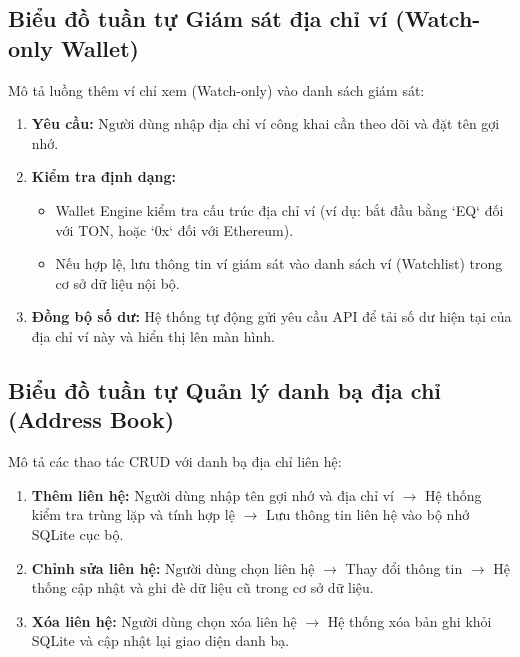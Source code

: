 \documentclass[a4paper]{report}
\begin{document}
\subsection{Biểu đồ tuần tự Giám sát địa chỉ ví (Watch-only Wallet)}


Mô tả luồng thêm ví chỉ xem (Watch-only) vào danh sách giám sát:
\begin{enumerate}
    \item \textbf{Yêu cầu:} Người dùng nhập địa chỉ ví công khai cần theo dõi và đặt tên gợi nhớ.
    \item \textbf{Kiểm tra định dạng:}
    \begin{itemize}
        \item Wallet Engine kiểm tra cấu trúc địa chỉ ví (ví dụ: bắt đầu bằng `EQ` đối với TON, hoặc `0x` đối với Ethereum).
        \item Nếu hợp lệ, lưu thông tin ví giám sát vào danh sách ví (Watchlist) trong cơ sở dữ liệu nội bộ.
    \end{itemize}
    \item \textbf{Đồng bộ số dư:} Hệ thống tự động gửi yêu cầu API để tải số dư hiện tại của địa chỉ ví này và hiển thị lên màn hình.
\end{enumerate}

\subsection{Biểu đồ tuần tự Quản lý danh bạ địa chỉ (Address Book)}


Mô tả các thao tác CRUD với danh bạ địa chỉ liên hệ:
\begin{enumerate}
    \item \textbf{Thêm liên hệ:} Người dùng nhập tên gợi nhớ và địa chỉ ví $\rightarrow$ Hệ thống kiểm tra trùng lặp và tính hợp lệ $\rightarrow$ Lưu thông tin liên hệ vào bộ nhớ SQLite cục bộ.
    \item \textbf{Chỉnh sửa liên hệ:} Người dùng chọn liên hệ $\rightarrow$ Thay đổi thông tin $\rightarrow$ Hệ thống cập nhật và ghi đè dữ liệu cũ trong cơ sở dữ liệu.
    \item \textbf{Xóa liên hệ:} Người dùng chọn xóa liên hệ $\rightarrow$ Hệ thống xóa bản ghi khỏi SQLite và cập nhật lại giao diện danh bạ.
\end{enumerate}
\end{document}
